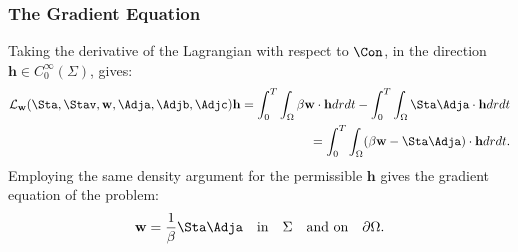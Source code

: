 \subsubsection{The Gradient Equation}
Taking the derivative of the Lagrangian with respect to $\Con$, in the direction $\mathbf{h} \in C_0^\infty(\Sigma)$, gives:
\begin{align*}
\mathcal{L}_{\mathbf{w}}(\Sta,\Stav,\mathbf{w},\Adja,\Adjb,\Adjc) \mathbf{h}= \int_0^T \int_\Omega \beta \mathbf{w} \cdot \mathbf{h} dr dt - \int_0^T \int_\Omega \Sta \Adja \cdot \mathbf{h} dr dt \\
= \int_0^T \int_\Omega ( \beta \mathbf{w} - \Sta \Adja) \cdot \mathbf{h} dr dt.
\end{align*}
Employing the same density argument for the permissible $\mathbf{h}$ gives the gradient equation of the problem:
\begin{align*}
 \mathbf{w} = \frac{1}{\beta} \Sta \Adja \quad \text{in} \quad \Sigma \quad \text{and on} \quad \partial\Omega.
\end{align*}

